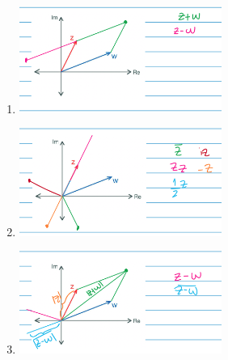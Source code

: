 \begin{enumerate}
    \item \includegraphics[width=250px]{6.2.1}
    \item \includegraphics[width=250px]{6.2.2}
    \item \includegraphics[width=250px]{6.2.3}
\end{enumerate}



